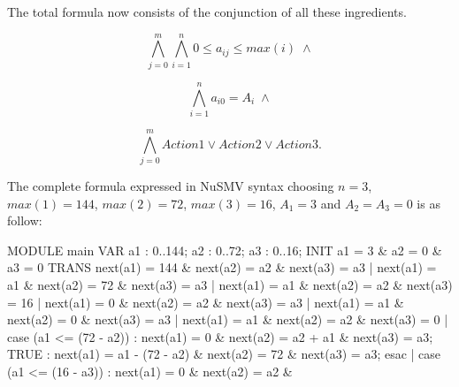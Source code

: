 The total formula now consists of the conjunction of all these ingredients.

\[\bigwedge_{j=0}^m \bigwedge_{i=1}^n 0 \leq a_{ij} \leq max(i) \;\wedge\]

\[\bigwedge_{i=1}^n a_{i0} = A_{i} \;\wedge\]

\[\bigwedge_{j=0}^m Action1 \vee Action2 \vee Action3.\]

The complete formula expressed in NuSMV syntax choosing $n = 3$, $max(1) = 144$, $max(2)=72$, $max(3)=16$, $A_1 = 3$ and $A_2=A_3=0$ is as follow:

\vspace{3mm}
\selectfont
{\footnotesize
\noindent
MODULE main\newline
VAR\newline
 a1 : 0..144;\newline
 a2 : 0..72;\newline
 a3 : 0..16;\newline
INIT\newline
 a1 = 3 \& a2 = 0 \& a3 = 0\newline
TRANS\newline
 next(a1) = 144 \& next(a2) = a2 \& next(a3) = a3 | \newline
 next(a1) = a1  \& next(a2) = 72 \& next(a3) = a3 | \newline
 next(a1) = a1  \& next(a2) = a2 \& next(a3) = 16 |\newline
 next(a1) =  0  \& next(a2) = a2 \& next(a3) = a3 | \newline
 next(a1) = a1  \& next(a2) =  0 \& next(a3) = a3 | \newline
 next(a1) = a1  \& next(a2) = a2 \& next(a3) =  0 |\newline
 \newline
 case (a1 <= (72 - a2)) : next(a1) = 0 \&\newline
						  next(a2) = a2 + a1 \& \newline
						  next(a3) = a3;\newline
 TRUE : next(a1) = a1 - (72 - a2) \&\newline
		next(a2) = 72 \&\newline
		next(a3) = a3; \newline
 \newline
 esac |\newline
 \newline
 case (a1 <= (16 - a3)) : next(a1) = 0 \&\newline
						  next(a2) = a2 \& \newline
}
